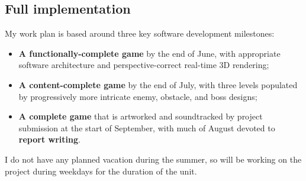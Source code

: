 \documentclass{article}
\begin{document}
\subsection*{Full implementation}
My work plan is based around three key software development milestones:
\begin{itemize}
    \item \textbf{A functionally-complete game} by the end of June,
    with appropriate software architecture\cite{nystrom}
    and perspective-correct real-time 3D rendering\cite{gambetta};
    \item \textbf{A content-complete game} by the end of July,
    with three levels populated by progressively more intricate enemy, obstacle, and boss designs;
    \item \textbf{A complete game} that is artworked and soundtracked
    by project submission at the start of September, with much of August devoted to
    \textbf{report writing}.
\end{itemize}
I do not have any planned vacation during the summer, so will be working on the
project during weekdays for the duration of the unit.

\printbibliography
\end{document}
